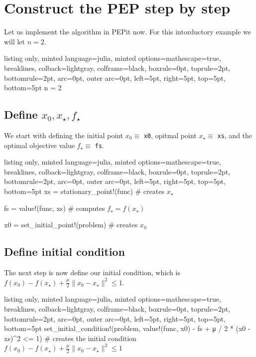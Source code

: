 \documentclass{article}
\begin{document}
\section{Construct the PEP step by step}

Let us implement the algorithm in PEPit now. For this intorductory example we will let $n=2$.

\begin{tcblisting}{listing only, minted language=julia, minted options={mathescape=true, breaklines}, colback=lightgray, colframe=black, boxrule=0pt, toprule=2pt, bottomrule=2pt, arc=0pt, outer arc=0pt, left=5pt, right=5pt, top=5pt, bottom=5pt}
n = 2
\end{tcblisting}


\subsection{Define $x_0, x_\star, f_\star$}
We start with defining the initial point $x_0 \equiv $ \texttt{x0}, opitmal point $x_\star \equiv$ \texttt{xs}, and the optimal objective value $f_\star \equiv$ \texttt{fs}.

\begin{tcblisting}{listing only, minted language=julia, minted options={mathescape=true, breaklines}, colback=lightgray, colframe=black, boxrule=0pt, toprule=2pt, bottomrule=2pt, arc=0pt, outer arc=0pt, left=5pt, right=5pt, top=5pt, bottom=5pt}
xs = stationary_point!(func) # creates $x_\star$

fs = value!(func, xs) # computes $f_\star = f(x_\star)$

x0 = set_initial_point!(problem) # creates $x_0$
\end{tcblisting}


\subsection{Define initial condition}

The next step is now define our initial condition, which is $f(x_0) -  f(x_\star) + \frac{\mu}{2}\|x_0 - x_\star\|^2 \leq 1$. 

\begin{tcblisting}{listing only, minted language=julia, minted options={mathescape=true, breaklines}, colback=lightgray, colframe=black, boxrule=0pt, toprule=2pt, bottomrule=2pt, arc=0pt, outer arc=0pt, left=5pt, right=5pt, top=5pt, bottom=5pt}
set_initial_condition!(problem, value!(func, x0) - fs + μ / 2 * (x0 - xs)^2 <= 1) # creates the initial condition $f(x_0) -  f(x_\star) + \frac{\mu}{2}\|x_0 - x_\star\|^2 \leq 1$
\end{tcblisting}
\end{document}
